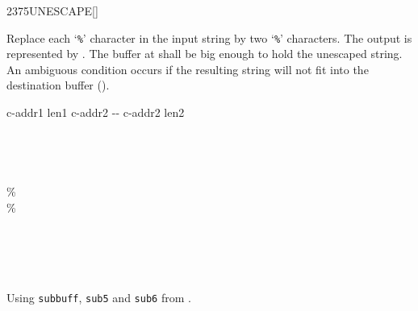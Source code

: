 \begin{worddef}{2375}{UNESCAPE}[]%
\item {}

	Replace each `\texttt{\%}' character in the input string
	 by two `\texttt{\%}' characters.  The output
	is represented by .  The buffer at 
	shall be big enough to hold the unescaped string.  An ambiguous
	condition occurs if the resulting string will not fit into the
	destination buffer ().


	\begin{implement} %
		\word{:}   c-addr1 len1 c-addr2 -{}- c-addr2 len2 \\
		  \\
		  \\
		  \\
		\tab {}    \word{+}   \\
		\tab[2]   \word{[CHAR]} \% \word{=}  \\
		\tab[3] \word{[CHAR]} \%    \\
		\tab[2]  \\
		\tab[2]      \\
		\tab {} \\
		\tab {} \word{-} \\
		\word{;}
	\end{implement}

	\begin{testing} %
		Using \texttt{subbuff}, \texttt{sub5} and \texttt{sub6} from .

	\end{testing}
\end{worddef}
\endinput
